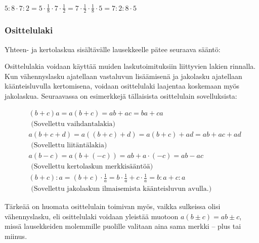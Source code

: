 
\begin{esimerkki}
$5:8\cdot 7:2=5\cdot\frac18\cdot 7\cdot\frac12=7\cdot \frac12\cdot\frac18\cdot 5=7:2:8\cdot 5$
\end{esimerkki}

\subsubsection*{Osittelulaki}

Yhteen- ja kertolaskua sisältävälle lausekkeelle pätee seuraava sääntö:


Osittelulakia voidaan käyttää muiden laskutoimituksiin liittyvien lakien rinnalla. Kun vähennyslasku ajatellaan vastaluvun lisäämisenä ja jakolasku ajatellaan käänteisluvulla kertomisena, voidaan osittelulaki laajentaa koskemaan myös jakolaskua. Seuraavassa on esimerkkejä tällaisista osittelulain sovelluksista:

\begin{esimerkki}
\begin{align*}
&(b+c)a = a(b+c) = ab+ac = ba+ca \\
&\text{ (Sovellettu vaihdantalakia)} \\
&a(b+c+d) = a((b+c)+d) = a(b+c)+ad = ab+ac+ad \\
&\text{ (Sovellettu liitäntälakia)} \\
&a(b-c) = a(b+(-c))=ab+a\cdot(-c)=ab-ac \\
&\text{ (Sovellettu kertolaskun merkkisääntöä)} \\
&(b+c):a = (b+c)\cdot\frac1a = b\cdot\frac1a+c\cdot\frac1a = b:a+c:a \\
&\text{ (Sovellettu jakolaskun ilmaisemista käänteisluvun avulla.) }
\end{align*}
\end{esimerkki}

Tärkeää on huomata osittelulain toimivan myös, vaikka sulkeissa olisi vähennyslasku, eli osittelulaki voidaan yleistää muotoon $a(b\pm c)=ab \pm c$, missä lausekkeiden molemmille puolille valitaan aina sama merkki -- plus tai miinus.

